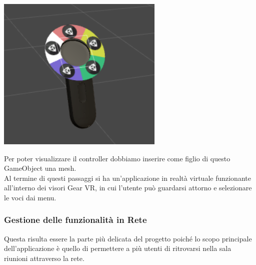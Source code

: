 \begin{minipage}[h]{0.2\textwidth}
	\includegraphics[width=\textwidth]{figure/radial}
	
\end{minipage}


\vspace{0.5cm}
Per poter visualizzare il controller dobbiamo inserire come figlio di questo GameObject una mesh.\\

Al termine di questi passaggi si ha un'applicazione in realtà virtuale funzionante all'interno dei visori Gear VR, in cui l'utente può guardarsi attorno e selezionare le voci dai menu.

\subsubsection{Gestione delle funzionalità in Rete}
Questa risulta essere la parte più delicata del progetto poiché lo scopo principale dell'applicazione è quello di permettere a più utenti di ritrovarsi nella sala riunioni attraverso la rete. \\

